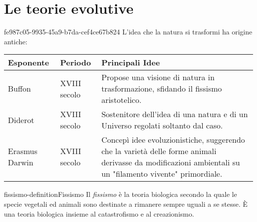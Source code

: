 \documentclass[preview]{standalone}
\begin{document}
\genpage

\section{Le teorie evolutive}

\begin{snippet}{fe987c05-9935-45a9-b7da-cef4ce67b824}
    L'idea che la natura si trasformi ha origine antiche: \\
    \begin{table}[htbp]
        \centering
        \begin{tabularx}{0.85\textwidth}{|l|l|X|}
            \hline 
            Esponente & Periodo & Principali Idee \\
            \hline 
            Buffon & XVIII secolo & Propose una visione di natura in trasformazione, sfidando il fissismo aristotelico. \\
            \hline 
            Diderot & XVIII secolo & Sostenitore dell'idea di una natura e di un Universo regolati soltanto dal caso. \\
            \hline 
            Erasmus Darwin & XVIII secolo & Concepì idee evoluzionistiche, suggerendo che la varietà delle forme animali derivasse da modificazioni ambientali su un "filamento vivente" primordiale. \\
            \hline
        \end{tabularx}
    \end{table}
    \vspace{0.25cm}
\end{snippet}

\begin{snippetdefinition}{fissismo-definition}{Fissismo}
    Il \textit{fissismo} è la teoria biologica secondo la quale le specie vegetali ed animali sono destinate a rimanere sempre uguali a se stesse. È una teoria biologica insieme al catastrofismo e al creazionismo. 
\end{snippetdefinition}
\end{document}

